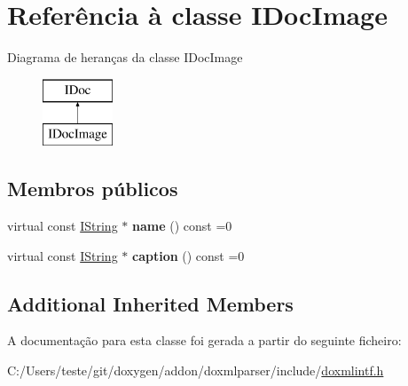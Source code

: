 \hypertarget{class_i_doc_image}{\section{Referência à classe I\-Doc\-Image}
\label{class_i_doc_image}
}
Diagrama de heranças da classe I\-Doc\-Image\begin{figure}[H]
\begin{center}
\leavevmode
\includegraphics[height=2.000000cm]{class_i_doc_image}
\end{center}
\end{figure}
\subsection*{Membros públicos}
\begin{DoxyCompactItemize}
\item 
\hypertarget{class_i_doc_image_af687440943d0a80c2b38cd5bb51b7a68}{virtual const \hyperlink{class_i_string}{I\-String} $\ast$ {\bfseries name} () const =0}\label{class_i_doc_image_af687440943d0a80c2b38cd5bb51b7a68}

\item 
\hypertarget{class_i_doc_image_a905140ec6bc1486d8f85deaa25657f28}{virtual const \hyperlink{class_i_string}{I\-String} $\ast$ {\bfseries caption} () const =0}\label{class_i_doc_image_a905140ec6bc1486d8f85deaa25657f28}

\end{DoxyCompactItemize}
\subsection*{Additional Inherited Members}


A documentação para esta classe foi gerada a partir do seguinte ficheiro\-:\begin{DoxyCompactItemize}
\item 
C\-:/\-Users/teste/git/doxygen/addon/doxmlparser/include/\hyperlink{include_2doxmlintf_8h}{doxmlintf.\-h}\end{DoxyCompactItemize}
